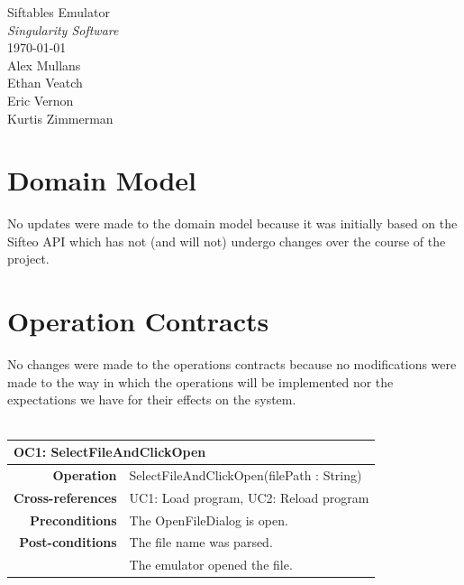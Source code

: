 \documentclass[12pt]{article}
\begin{document}
\vspace*{\fill}
        \begin{center}
                \LARGE{Siftables Emulator} \\
                \LARGE{\textit{Singularity Software}} \\
                \vspace{.15in}
                \large{\today} \\
                \vspace{4in}
                        Alex Mullans \\
                        Ethan Veatch \\
                        Eric Vernon \\
                        Kurtis Zimmerman
        \end{center}
\vspace*{\fill}
\thispagestyle{empty}

\clearpage

\section{Domain Model}
No updates were made to the domain model because it was initially based on the Sifteo API which has not (and will not) undergo changes over the course of the project.

\section{Operation Contracts}
No changes were made to the operations contracts because no modifications were made to the way in which the operations will be implemented nor the expectations we have for their effects on the system.
\\\\
\begin{tabular*}{\textwidth}{r | l}
  \multicolumn{2}{l}{\textbf{OC1: SelectFileAndClickOpen}} \\ \hline
  \textbf{Operation} & SelectFileAndClickOpen(filePath : String) \\
  \textbf{Cross-references} & UC1: Load  program, UC2: Reload program \\
  \textbf{Preconditions} & The OpenFileDialog is open. \\
  \textbf{Post-conditions} & The file name was parsed. \\
                            & The emulator opened the file. \\ \hline
\end{tabular*} \\\\
\end{document}
